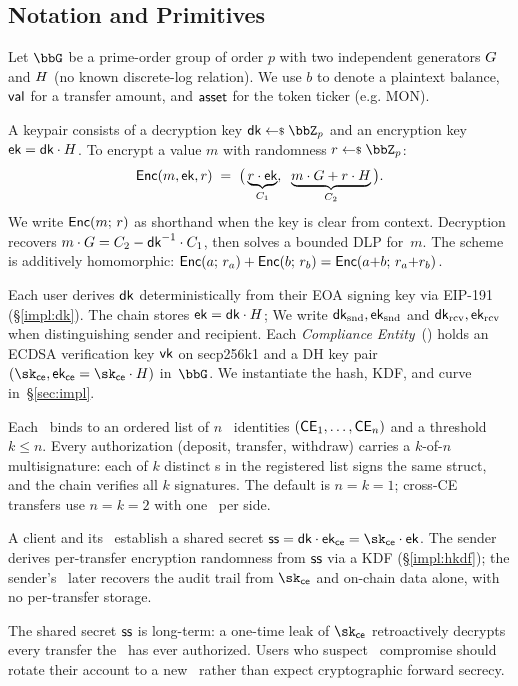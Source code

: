 \subsection{Notation and Primitives}
\label{sec:notation}

Let $\G$ be a prime-order group of order $p$ with two independent generators $G$ and $H$ (no known discrete-log relation).
We use $b$ to denote a plaintext balance, $\mathsf{val}$ for a transfer amount, and $\mathsf{asset}$ for the token ticker (e.g. MON).

\one
{}
A keypair consists of a decryption key $\dk \getsr \Z_p$ and an encryption key $\textsf{ek} = \textsf{dk} \cdot H$.
To encrypt a value $m$ with randomness $r \getsr \Z_p$:
%
\[
  {\mathsf{Enc}}(m, \textsf{ek}, r) \;=\; \bigl(\,\underbrace{r \cdot \textsf{ek}}_{C_1},\;\;
  \underbrace{m \cdot G + r \cdot H}_{C_2}\,\bigr).
\]
%
We write ${\mathsf{Enc}}(m;\, r)$ as shorthand when the key is clear from context.
Decryption recovers $m \cdot G = C_2 - \textsf{dk}^{-1} \cdot C_1$, then solves a bounded DLP for~$m$.
The scheme is additively homomorphic: ${\mathsf{Enc}}(a;\, r_a) + {\mathsf{Enc}}(b;\, r_b) = {\mathsf{Enc}}(a{+}b;\, r_a{+}r_b)$.


Each user derives $\textsf{dk}$ deterministically from their EOA signing key via EIP-191 (\S\ref{impl:dk}).
The chain stores $\textsf{ek} = \textsf{dk} \cdot H$; We write $\textsf{dk}_{\rm snd}, \textsf{ek}_{\rm snd}$ and $\textsf{dk}_{\rm rcv}, \textsf{ek}_{\rm rcv}$ when distinguishing sender and recipient.
Each \emph{Compliance Entity}~(\CE) holds an ECDSA verification key $\mathsf{vk}$ on secp256k1 and a DH key pair $(\cesk, \ceek = \cesk \cdot \genH)$ in~$\G$.
We instantiate the hash, KDF, and curve in~\S\ref{sec:impl}.

Each \CMAccount\ binds to an ordered list of $n$ \CE\ identities $(\mathsf{CE}_1, \ldots, \mathsf{CE}_n)$ and a threshold $k \le n$.
Every authorization (deposit, transfer, withdraw) carries a $k$-of-$n$ multisignature: each of $k$ distinct \CE s in the registered list signs the same struct, and the chain verifies all $k$ signatures.
The default is $n = k = 1$; cross-CE transfers use $n = k = 2$ with one \CE\ per side.

A client and its \CE\ establish a shared secret $\sharedsecret = \dk \cdot \ceek = \cesk \cdot \ek$.
The sender derives per-transfer encryption randomness from $\mathsf{ss}$ via a KDF (\S\ref{impl:hkdf}); the sender's \CE\ later recovers the audit trail from $\cesk$ and on-chain data alone, with no per-transfer storage.

The shared secret $\mathsf{ss}$ is long-term: a one-time leak of $\cesk$ retroactively decrypts every transfer the \CE\ has ever authorized.
Users who suspect \CE\ compromise should rotate their account to a new \CE\ rather than expect cryptographic forward secrecy.
